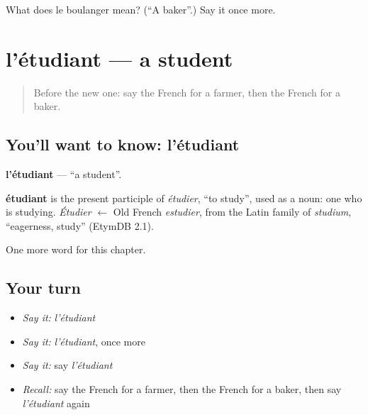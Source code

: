 \begin{tcolorbox}[breakable,colback=teal!4,colframe=teal!35!black,title={Before you move on}]
What does le boulanger mean? (\textquotedblleft{}A baker\textquotedblright{}.) Say it once more.
\end{tcolorbox}
\section[l'étudiant]{l'étudiant — a student}

\label{lesson:FR-C124-etudiant}



\begin{quote}
Before the new one: say the French for a farmer, then the French for a baker.
\end{quote}

\subsection*{You'll want to know: l'étudiant}
\textbf{l'étudiant} — \textquotedblleft{}a student\textquotedblright{}.

\begin{cousinweb}
\textbf{étudiant} is the present participle of \emph{étudier}, \textquotedblleft{}to study\textquotedblright{}, used as a noun: one who is studying. \emph{Étudier} $\leftarrow$ Old French \emph{estudier}, from the Latin family of \emph{studium}, \textquotedblleft{}eagerness, study\textquotedblright{} (EtymDB 2.1).
\end{cousinweb}

\begin{grammarlens}[title={What you've built}]
One more word for this chapter.
\end{grammarlens}

\subsection*{Your turn}
\begin{itemize}
\raggedright
  \item \emph{Say it:} \emph{l'étudiant}
  \item \emph{Say it:} \emph{l'étudiant}, once more
  \item \emph{Say it:} say \emph{l'étudiant}
  \item \emph{Recall:} say the French for a farmer, then the French for a baker, then say \emph{l'étudiant} again
\end{itemize}

